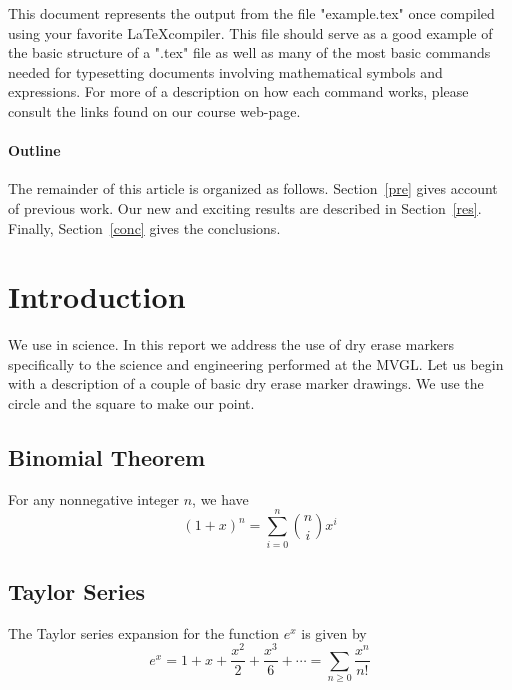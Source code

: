 \documentclass[12pt,a4paper]{mvgl}
\begin{document}
\begin{mvglReport}

\date{}



\subject{On the Use of MVGL Report Template}


This document represents the output from the file "example.tex" once compiled using your favorite \LaTeX compiler.  This file should serve as a good example of the basic structure of a ".tex" file as well as many of the most basic commands needed for typesetting documents involving mathematical symbols and expressions. For more of a description on how each command works, please consult the links found on our course web-page.

\paragraph{Outline}
The remainder of this article is organized as follows.
Section~\ref{pre} gives account of previous work.
Our new and exciting results are described in Section~\ref{res}.
Finally, Section~\ref{conc} gives the conclusions.

\section{Introduction}
\label{Intro}
We use in science. In this report we address the use of dry
erase markers specifically to the science and engineering
performed at the MVGL. Let us begin
with a description of a couple of basic dry erase marker
drawings. We use the circle and the square to make our point.

\subsection{Binomial Theorem}
For any nonnegative integer $n$, we have
$$(1+x)^n = \sum_{i=0}^n {n \choose i} x^i$$

\subsection{Taylor Series}
The Taylor series expansion for the function $e^x$ is given by
\begin{equation}
e^x = 1 + x + \frac{x^2}{2} + \frac{x^3}{6} + \cdots = \sum_{n\geq 0} \frac{x^n}{n!}
\end{equation}


\end{mvglReport}
\end{document}
